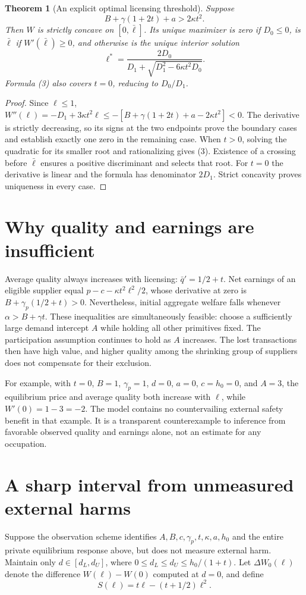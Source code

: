 \documentclass[11pt,a4paper]{article}
\newtheorem{theorem}{Theorem}[section]
\theoremstyle{definition}
\theoremstyle{remark}
\begin{document}
\begin{theorem}[An explicit optimal licensing threshold]
Suppose
\[
 B+\gamma(1+2t)+a>2\kappa t^2.\tag{2}
\]
Then $W$ is strictly concave on $[0,\bar\ell]$. Its unique maximizer is zero if $D_0\leq0$, is $\bar\ell$ if $W'(\bar\ell)\geq0$, and otherwise is the unique interior solution
\[
 \ell^*=\frac{2D_0}{D_1+\sqrt{D_1^2-6\kappa t^2D_0}}.\tag{3}
\]
Formula (3) also covers $t=0$, reducing to $D_0/D_1$.
\end{theorem}
\begin{proof}
Since $\ell\leq1$,
$W''(\ell)=-D_1+3\kappa t^2\ell\leq-[B+\gamma(1+2t)+a-2\kappa t^2]<0$.
The derivative is strictly decreasing, so its signs at the two endpoints prove the boundary cases and establish exactly one zero in the remaining case. When $t>0$, solving the quadratic for its smaller root and rationalizing gives (3). Existence of a crossing before $\bar\ell$ ensures a positive discriminant and selects that root. For $t=0$ the derivative is linear and the formula has denominator $2D_1$. Strict concavity proves uniqueness in every case.
\end{proof}

\section{Why quality and earnings are insufficient}
Average quality always increases with licensing: $\bar q'=1/2+t$. Net earnings of an eligible supplier equal $p-c-\kappa t^2\ell^2/2$, whose derivative at zero is $B+\gamma_p(1/2+t)>0$. Nevertheless, initial aggregate welfare falls whenever $\alpha>B+\gamma t$. These inequalities are simultaneously feasible: choose a sufficiently large demand intercept $A$ while holding all other primitives fixed. The participation assumption continues to hold as $A$ increases. The lost transactions then have high value, and higher quality among the shrinking group of suppliers does not compensate for their exclusion.

For example, with $t=0$, $B=1$, $\gamma_p=1$, $d=0$, $a=0$, $c=h_0=0$, and $A=3$, the equilibrium price and average quality both increase with $\ell$, while $W'(0)=1-3=-2$. The model contains no countervailing external safety benefit in that example. It is a transparent counterexample to inference from favorable observed quality and earnings alone, not an estimate for any occupation.

\section{A sharp interval from unmeasured external harms}
Suppose the observation scheme identifies $A,B,c,\gamma_p,t,\kappa,a,h_0$ and the entire private equilibrium response above, but does not measure external harm. Maintain only $d\in[d_L,d_U]$, where $0\leq d_L\leq d_U\leq h_0/(1+t)$. Let $\Delta W_0(\ell)$ denote the difference $W(\ell)-W(0)$ computed at $d=0$, and define
\[
 S(\ell)=t\ell-(t+1/2)\ell^2.
\]
\end{document}
